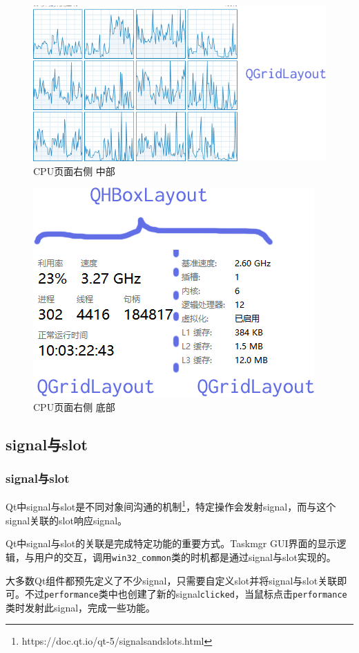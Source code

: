 \documentclass{beamer}
\newcommand\code[1]{\texttt{#1}}
\begin{document}
\begin{frame}
    \begin{figure}
        \centering
        \includegraphics[scale=0.5]{../media/layout/cpu right mid.png}
        \caption{CPU页面右侧 中部}
        \label{fig:cpupagerightmid}
    \end{figure}
\end{frame}

\begin{frame}
    \begin{figure}
        \centering
        \includegraphics[scale=0.7]{../media/layout/cpupage right butt.png}
        \caption{CPU页面右侧 底部}
        \label{fig:cpupagerightbutt}
    \end{figure}
\end{frame}

\subsection{signal与slot}
\begin{frame}
    \frametitle{signal与slot}
    Qt中signal与slot是不同对象间沟通的机制\footnote{https://doc.qt.io/qt-5/signalsandslots.html}，特定操作会发射signal，而与这个signal关联的slot响应signal。

Qt中signal与slot的关联是完成特定功能的重要方式。Taskmgr GUI界面的显示逻辑，与用户的交互，调用\code{win32\_common}类的时机都是通过signal与slot实现的。

大多数Qt组件都预先定义了不少signal，只需要自定义slot并将signal与slot关联即可。不过\code{performance}类中也创建了新的signal\code{clicked}，当鼠标点击\code{performance}类时发射此signal，完成一些功能。
\end{frame}
\end{document}
